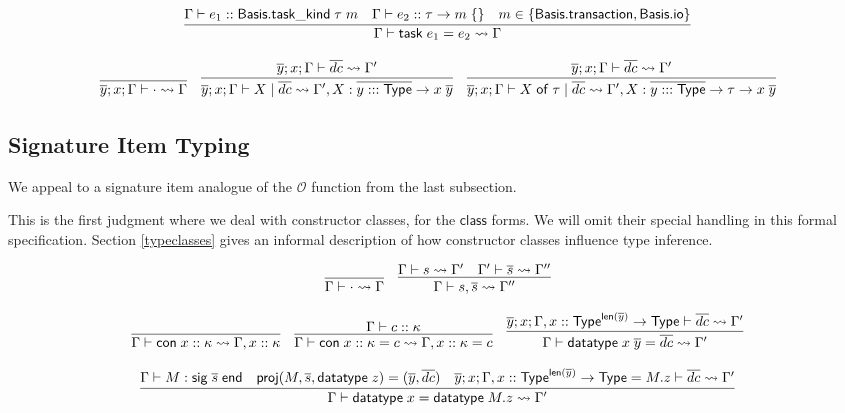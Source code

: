 \documentclass{article}
\newcommand{\mt}[1]{\mathsf{#1}}
\begin{document}
$$\infer{\Gamma \vdash \mt{task} \; e_1 = e_2 \leadsto \Gamma}{
  \Gamma \vdash e_1 :: \mt{Basis}.\mt{task\_kind} \; \tau \; m
  & \Gamma \vdash e_2 :: \tau \to m \; \{\}
  & m \in \{\mt{Basis}.\mt{transaction}, \mt{Basis}.\mt{io}\}
}$$

$$\infer{\overline{y}; x; \Gamma \vdash \cdot \leadsto \Gamma}{}
\quad \infer{\overline{y}; x; \Gamma \vdash X \mid \overline{dc} \leadsto \Gamma', X : \overline{y ::: \mt{Type}} \to x \; \overline{y}}{
  \overline{y}; x; \Gamma \vdash \overline{dc} \leadsto \Gamma'
}
\quad \infer{\overline{y}; x; \Gamma \vdash X \; \mt{of} \; \tau \mid \overline{dc} \leadsto \Gamma', X : \overline{y ::: \mt{Type}} \to \tau \to x \; \overline{y}}{
  \overline{y}; x; \Gamma \vdash \overline{dc} \leadsto \Gamma'
}$$

\subsection{Signature Item Typing}

We appeal to a signature item analogue of the $\mathcal O$ function from the last subsection.

This is the first judgment where we deal with constructor classes, for the $\mt{class}$ forms.  We will omit their special handling in this formal specification.  Section \ref{typeclasses} gives an informal description of how constructor classes influence type inference.

$$\infer{\Gamma \vdash \cdot \leadsto \Gamma}{}
\quad \infer{\Gamma \vdash s, \overline{s} \leadsto \Gamma''}{
  \Gamma \vdash s \leadsto \Gamma'
  & \Gamma' \vdash \overline{s} \leadsto \Gamma''
}$$

$$\infer{\Gamma \vdash \mt{con} \; x :: \kappa \leadsto \Gamma, x :: \kappa}{}
\quad \infer{\Gamma \vdash \mt{con} \; x :: \kappa = c \leadsto \Gamma, x :: \kappa = c}{
  \Gamma \vdash c :: \kappa
}
\quad \infer{\Gamma \vdash \mt{datatype} \; x \; \overline{y} = \overline{dc} \leadsto \Gamma'}{
  \overline{y}; x; \Gamma, x :: \mt{Type}^{\mt{len}(\overline y)} \to \mt{Type} \vdash \overline{dc} \leadsto \Gamma'
}$$

$$\infer{\Gamma \vdash \mt{datatype} \; x = \mt{datatype} \; M.z \leadsto \Gamma'}{
  \Gamma \vdash M : \mt{sig} \; \overline{s} \; \mt{end}
  & \mt{proj}(M, \overline{s}, \mt{datatype} \; z) = (\overline{y}, \overline{dc})
  & \overline{y}; x; \Gamma, x :: \mt{Type}^{\mt{len}(\overline y)} \to \mt{Type} = M.z \vdash \overline{dc} \leadsto \Gamma'
}$$
\end{document}
